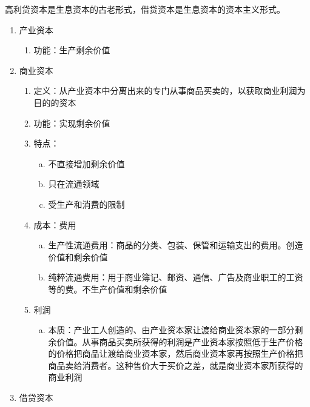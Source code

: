 \documentclass[12pt]{book}
\begin{document}
高利贷资本是生息资本的古老形式，借贷资本是生息资本的资本主义形式。
\\



\begin{enumerate}[1.]
    \item 产业资本
          \begin{enumerate}[(1)]
              \item 功能：生产剩余价值
          \end{enumerate}
    \item 商业资本
          \begin{enumerate}[(1)]
              \item 定义：从产业资本中分离出来的专门从事商品买卖的，以获取商业利润为目的的资本
              \item 功能：实现剩余价值
              \item 特点：
                    \begin{enumerate}[a.]
                        \item 不直接增加剩余价值
                        \item 只在流通领域
                        \item 受生产和消费的限制
                    \end{enumerate}
              \item 成本：费用
                    \begin{enumerate}[a.]
                        \item 生产性流通费用：商品的分类、包装、保管和运输支出的费用。创造价值和剩余价值
                        \item 纯粹流通费用：用于商业簿记、邮资、通信、广告及商业职工的工资等的费。不生产价值和剩余价值
                    \end{enumerate}
              \item 利润
                    \begin{enumerate}[a.]
                        \item 本质：产业工人创造的、由产业资本家让渡给商业资本家的一部分剩余价值。从事商品买卖所获得的利润是产业资本家按照低于生产价格的价格把商品让渡给商业资本家，然后商业资本家再按照生产价格把商品卖给消费者。这种售价大于买价之差，就是商业资本家所获得的商业利润
                    \end{enumerate}
          \end{enumerate}
    \item 借贷资本
          \begin{enumerate}[(1)]

\end{enumerate}
\end{enumerate}
\end{document}
